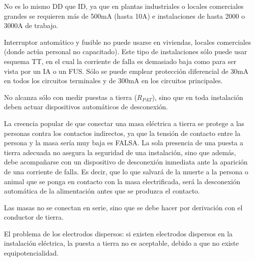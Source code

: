 No es lo mismo DD que ID, ya que en plantas industriales o locales comerciales grandes se requieren más de 500mA (hasta 10A) e instalaciones de hasta 2000 o 3000A de trabajo.

Interruptor automático y fusible no puede usarse en viviendas, locales comerciales (donde actúa personal no capacitado). Este tipo de instalaciones sólo puede usar esquema TT, en el cual la corriente de falla es demasiado baja como para ser vista por un IA o un FUS. Sólo se puede emplear protección diferencial de 30mA en todos los circuitos terminales y de 300mA en los circuitos principales.

No alcanza sólo con medir puestas a tierra ($R_{PAT}$), sino que en toda instalación deben actuar dispositivos automáticos de desconexión.

La creencia popular de que conectar una masa eléctrica a tierra se protege a las personas contra los contactos indirectos, ya que la tensión de contacto entre la persona y la masa sería muy baja es FALSA. La sola presencia de una puesta a tierra adecuada no asegura la seguridad de una instalación, sino que además, debe acompañarse con un dispositivo de desconexión inmediata ante la aparición de una corriente de falla. Es decir, que lo que salvará de la muerte a la persona o animal que se ponga en contacto con la masa electrificada, será la desconexión automática de la alimentación antes que se produzca el contacto.


Las masas no se conectan en serie, sino que se debe hacer por derivación con el conductor de tierra.


El problema de los electrodos dispersos: si existen electrodos dispersos en la instalación eléctrica, la puesta a tierra no es aceptable, debido a que no existe equipotencialidad.

